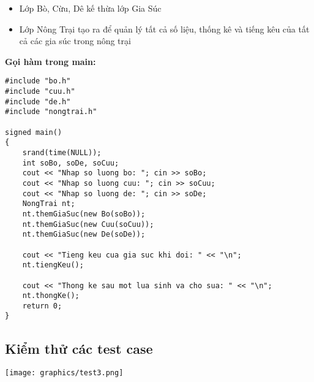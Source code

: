 \begin{itemize}
    \item Lớp Bò, Cừu, Dê kế thừa lớp Gia Súc
    \item Lớp Nông Trại tạo ra để quản lý tất cả số liệu, thống kê và tiếng kêu của tất cả các gia súc trong nông trại
\end{itemize}
\item{\textbf{Gọi hàm trong main:}}
\begin{verbatim} 
#include "bo.h"
#include "cuu.h" 
#include "de.h"
#include "nongtrai.h"

signed main()
{
    srand(time(NULL));
    int soBo, soDe, soCuu;
    cout << "Nhap so luong bo: "; cin >> soBo;
    cout << "Nhap so luong cuu: "; cin >> soCuu;
    cout << "Nhap so luong de: "; cin >> soDe;
    NongTrai nt;
    nt.themGiaSuc(new Bo(soBo));
    nt.themGiaSuc(new Cuu(soCuu));
    nt.themGiaSuc(new De(soDe));

    cout << "Tieng keu cua gia suc khi doi: " << "\n";
    nt.tiengKeu();

    cout << "Thong ke sau mot lua sinh va cho sua: " << "\n";
    nt.thongKe();
    return 0;
}
\end{verbatim}
\subsection{Kiểm thử các test case}
\texttt{[image: graphics/test3.png]}

